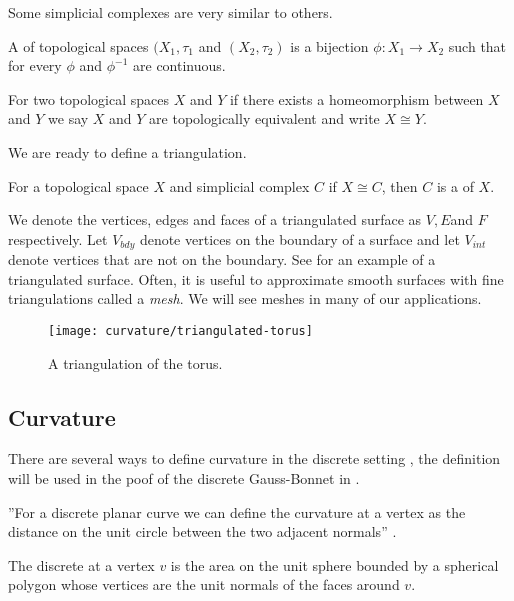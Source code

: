 Some simplicial complexes are very similar to others.


\begin{definition}[Homeomorphism]
A    of topological spaces $(X_1,\tau_1$ and $(X_2,\tau_2)$
is a bijection $\phi:X_1\to X_2$ such that for every $\phi$ and $\phi^{-1}$ are continuous.
\end{definition}
For two topological spaces $X$ and $Y$ if there exists a  homeomorphism between
$X$ and $Y$ we say $X$ and $Y$ are topologically  equivalent and write  $X\cong Y.$

We are ready to define a triangulation.

\begin{definition}[Triangulation]
For a topological space $X$ and simplicial complex $C$ if $X\cong C$,
then $C$  is a  of $X$.
\end{definition}

We denote the vertices, edges and faces of a triangulated surface as $V, E$and $F$ respectively.
Let $V_{bdy}$ denote vertices on the boundary of a surface and let $V_{int}$ 
denote vertices that are not on the boundary.
See  for an example of a triangulated surface.
Often, it is useful to approximate smooth surfaces with fine triangulations called
a \emph{mesh}. We will see meshes in many of our applications.


\begin{figure}[htb]
\centering
\texttt{[image: curvature/triangulated-torus]}
\caption{A triangulation of the torus.}
\label{fig:triangulated-torus}
\end{figure}

\subsection{Curvature}



There are several ways to define curvature in the discrete setting \cite{Crane:2013},
the  definition will be used in the poof of the discrete Gauss-Bonnet in .

''For a discrete planar curve we can define the curvature at a vertex as the distance on the unit circle between the two adjacent normals'' \cite{Crane:2013}.

\begin{definition}\label{def:discrete-curvature-vertex}

The discrete  at a vertex $v$ is the area on the unit sphere bounded by a spherical polygon whose vertices are the unit normals of the faces around $v$.

\end{definition}


